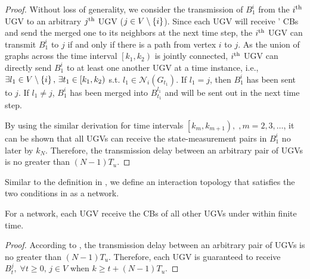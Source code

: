 	\begin{proof}				
		Without loss of generality, we consider the transmission of $B^i_1$ from the $i^\text{th}$ UGV to an arbitrary $j^\text{th}$ UGV ($j\in V\setminus \left\lbrace i\right\rbrace$).
		Since each UGV will receive \dnbhd' CBs and send the merged one to its neighbors at the next time step, the $i^\text{th}$ UGV can transmit $B^i_1$ to $j$ if and only if there is a path from vertex $i$ to $j$.
		As the union of graphs across the time interval $\left[k_1,k_2 \right)$ is jointly connected, $i^\text{th}$ UGV can directly send $B^i_1$ to at least one another UGV at a time instance, i.e., $\exists l_1\in V\setminus \left\lbrace i\right\rbrace,\, \exists t_1\in \left[k_1,k_2 \right)$ s.t. $l_1\in\mathcal{N}_{i}(G_{t_1})$.
		If $l_1=j$, then $B^i_1$ has been sent to $j$.
		If $l_1\neq j$, $B^i_1$ has been merged into $B^{l_1}_{t_1}$ and will be sent out in the next time step. 
		
		By using the similar derivation for time intervals $\left[k_m,k_{m+1} \right),\;,m=2,3,\dots$, it can be shown that all UGVs can receive the state-measurement pairs in $B^i_1$ no later by $k_{N}$.
		Therefore, the transmission delay between an arbitrary pair of UGVs is no greater than \small$(N-1)T_u$\normalsize.
	\end{proof}
	
	Similar to the definition in \cite{jadbabaie2003coordination}, we define an interaction topology that satisfies the two conditions in  as a \textit{{\fc}} network.

	\medskip
	\begin{cor}\label{cor1}
		For a {\fc} network, each UGV receive the CBs of all other UGVs under {\proto} within finite time. 
	\end{cor}
	\begin{proof}
		According to , the transmission delay between an arbitrary pair of UGVs is no greater than \small$(N-1)T_u$\normalsize.
		Therefore, each UGV is guaranteed to receive $B^j_t,\; \forall t\ge 0,\, j\in V$ when \small$k\geq t+(N-1)T_u$\normalsize.
	\end{proof}
	
